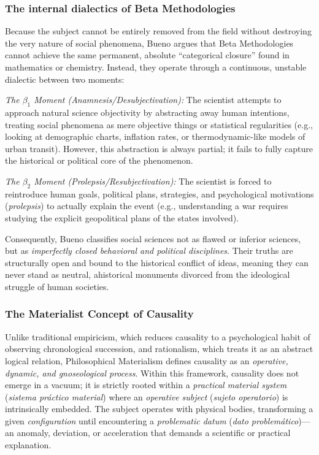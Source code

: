 \documentclass[11pt, a4paper]{article}
\begin{document}
\subsubsection*{The internal dialectics of Beta Methodologies}
Because the subject cannot be entirely removed from the field without destroying the very nature of social phenomena, Bueno argues that Beta Methodologies cannot achieve the same permanent, absolute ``categorical closure'' found in mathematics or chemistry. Instead, they operate through a continuous, unstable dialectic between two moments:

\emph{The $\beta_1$ Moment (Anamnesis/Desubjectivation):} The scientist attempts to approach natural science objectivity by abstracting away human intentions, treating social phenomena as mere objective things or statistical regularities (e.g., looking at demographic charts, inflation rates, or thermodynamic-like models of urban transit). However, this abstraction is always partial; it fails to fully capture the historical or political core of the phenomenon.

\emph{The $\beta_2$ Moment (Prolepsis/Resubjectivation):} The scientist is forced to reintroduce human goals, political plans, strategies, and psychological motivations (\emph{prolepsis}) to actually explain the event (e.g., understanding a war requires studying the explicit geopolitical plans of the states involved).

Consequently, Bueno classifies social sciences not as flawed or inferior sciences, but as \emph{imperfectly closed behavioral and political disciplines}. Their truths are structurally open and bound to the historical conflict of ideas, meaning they can never stand as neutral, ahistorical monuments divorced from the ideological struggle of human societies.




\subsubsection{The Materialist Concept of Causality}

Unlike traditional empiricism, which reduces causality to a psychological habit of observing chronological succession, and rationalism, which treats it as an abstract logical relation, Philosophical Materialism defines causality as an \emph{operative, dynamic, and gnoseological process}. Within this framework, causality does not emerge in a vacuum; it is strictly rooted within a \emph{practical material system} (\emph{sistema práctico material}) where an \emph{operative subject} (\emph{sujeto operatorio}) is intrinsically embedded. The subject operates with physical bodies, transforming a given \emph{configuration} until encountering a \emph{problematic datum} (\emph{dato problemático})—an anomaly, deviation, or acceleration that demands a scientific or practical explanation.
\end{document}
